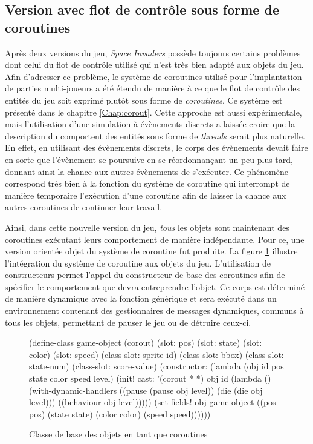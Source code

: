 \documentclass[12pt,twoside,letterpaper,francais]{book}
\newcommand{\si}{{\textit{Space Invaders }}}
\newcommand{\scheme}[1]{\selectlanguage{english}{\tt #1}\selectlanguage{french}}
\begin{document}
\subsection{Version avec flot de contrôle sous forme de coroutines} \label{Exp:sp3}
Après deux versions du jeu, \si possède toujours certains problèmes
dont celui du flot de contrôle utilisé qui n'est très bien adapté aux
objets du jeu. Afin d'adresser ce problème, le système de coroutines
utilisé pour l'implantation de parties multi-joueurs a été étendu de
manière à ce que le flot de contrôle des entités du jeu soit exprimé
plutôt sous forme de \emph{coroutines}. Ce système est présenté dans
le chapitre \ref{Chap:corout}. Cette approche est aussi expérimentale,
mais l'utilisation d'une simulation à évènements discrets a laissée
croire que la description du comportent des entités sous forme de
\textit{threads} serait plus naturelle. En effet, en utilisant des
évènements discrets, le corps des évènements devait faire en sorte que
l'évènement se poursuive en se réordonnançant un peu plus tard,
donnant ainsi la chance aux autres évènements de s'exécuter. Ce
phénomène correspond très bien à la fonction \scheme{yield} du système
de coroutine qui interrompt de manière temporaire l'exécution d'une
coroutine afin de laisser la chance aux autres coroutines de continuer
leur travail.

Ainsi, dans cette nouvelle version du jeu, \emph{tous} les objets sont
maintenant des coroutines exécutant leurs comportement de manière
indépendante. Pour ce, une version orientée objet du système de
coroutine fut produite. La figure \ref{Exp:si3-class} illustre
l'intégration du système de coroutine aux objets du jeu. L'utilisation
de constructeurs permet l'appel du constructeur de base des coroutines
afin de spécifier le comportement que devra entreprendre l'objet. Ce
corps est déterminé de manière dynamique avec la fonction générique
\scheme{behaviour} et sera exécuté dans un environnement contenant des
gestionnaires de messages dynamiques, communs à tous les objets,
permettant de pauser le jeu ou de détruire ceux-ci.\\

\begin{figure}[htb!]
  \begin{schemecode}
(define-class game-object (corout)
  (slot: pos)
  (slot: state)
  (slot: color)
  (slot: speed)
  (class-slot: sprite-id)
  (class-slot: bbox)
  (class-slot: state-num)
  (class-slot: score-value)
  (constructor: (lambda (obj id pos state color speed level)
                  (init! cast: '(corout * *) obj id
                         (lambda ()(with-dynamic-handlers
                                    ((pause (pause obj level))
                                     (die   (die   obj level)))
                                    ((behaviour obj level)))))
                  (set-fields! obj game-object
                    ((pos pos)     (state state)
                     (color color) (speed speed))))))
  \end{schemecode}
  \caption{Classe de base des objets en tant que coroutines}
  \label{Exp:si3-class}
\end{figure}
\end{document}
